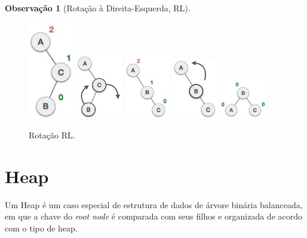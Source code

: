 \documentclass[a4paper, 12pt]{article}
\newtheorem{remark}{Observação}
\begin{document}
\begin{remark}[Rotação à Direita-Esquerda, RL]\end{remark}
\begin{figure}[H]
    \centering
    \includegraphics[width=2cm]{fig/t/left_subtree_of_right_subtree.jpg}
    \includegraphics[width=2cm]{fig/t/subtree_right_rotation.jpg}
    \includegraphics[width=2cm]{fig/t/right_unbalanced_tree.jpg}
    \includegraphics[width=2cm]{fig/t/left_rotation.jpg}
    \includegraphics[width=2cm]{fig/t/balanced_avl_tree (1).jpg}
    \caption{Rotação RL.}
\end{figure}

\newpage

\section{Heap}

Um Heap é um caso especial de estrutura de dados de árvore binária balanceada, em que a chave do \emph{root node} é comparada com seus filhos e organizada de acordo com o tipo de heap.
\end{document}

